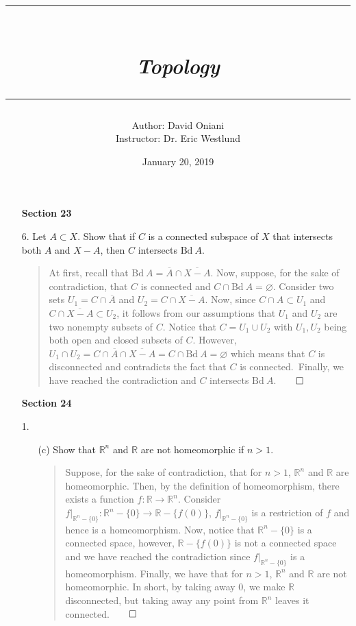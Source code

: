 \documentclass[12pt, a4paper]{article}
\title{\rule{\paperwidth - 150pt}{1pt}\textbf{\\\textit{Topology}\\}\rule{\paperwidth - 150pt}{1pt}}
\author
{
Author: David Oniani\\
Instructor: Dr. Eric Westlund
}
\date{January 20, 2019}
\newcommand{\reals}{\mathbb{R}}        %
\renewcommand{\emptyset}{\varnothing}  %
\begin{document}
\maketitle


\begin{itemize}
\item[]
\item[]
{\large \textbf{Section 23}}
\vspace{0.3cm}

\item[6.]
Let $A \subset X$. Show that if $C$ is a connected subspace of $X$
that intersects both $A$ and $X - A$, then $C$ intersects $\mbox{Bd} \ A$.
\begin{quote}
At first, recall that $\mbox{Bd} \ A = \overline{A} \cap \overline{X - A}$.
Now, suppose, for the sake of contradiction, that $C$ is connected and $C \cap \mbox{Bd} \ A = \emptyset$.
Consider two sets $U_1 = C \cap \overline{A}$ and $U_2 = C \cap \overline{X - A}$.
Now, since $C \cap A \subset U_1$ and $C \cap \overline{X - A} \subset U_2$, it follows
from our assumptions that $U_1$ and $U_2$ are two nonempty subsets of $C$.
Notice that $C = U_1 \cup U_2$ with $U_1, U_2$ being both open and closed subsets of $C$.
However, $U_1 \cap U_2 = C \cap \overline{A} \cap \overline{X - A} = C \cap \mbox{Bd} \ A = \emptyset$
which means that $C$ is disconnected and contradicts the fact that $C$ is connected.\
Finally, we have reached the contradiction and $C$ intersects $\mbox{Bd} \ A$.$\qed$
\end{quote}

\item[]
\item[]
\item[]
{\large \textbf{Section 24}}
\vspace{0.3cm}

\item[1.]
\begin{itemize}
\item[(c)]
Show that $\reals^n$ and $\reals$ are not homeomorphic if $n > 1$.
\begin{quote}
Suppose, for the sake of contradiction, that for $n > 1$, $\reals^n$ and $\reals$
are homeomorphic. Then, by the definition of homeomorphism, there exists a function
$f : \reals \to \reals^n$. Consider $\left.f \right|_{\reals^n-\{0\}} : \reals^n-\{0\} \to \reals - \{f(0)\}$,
$\left.f \right|_{\reals^n-\{0\}}$ is a restriction of $f$ and hence is a homeomorphism.
Now, notice that $\reals^n-\{0\}$ is a connected space, however, $\reals-\{f(0)\}$ is not a connected
space and we have reached the contradiction since $\left.f \right|_{\reals^n-\{0\}}$ is a homeomorphism.
Finally, we have that for $n > 1$, $\reals^n$ and $\reals$ are not homeomorphic.
In short, by taking away $0$, we make $\reals$ disconnected, but taking away any point from $\reals^n$
leaves it connected.$\qed$
\end{quote}
\end{itemize}


\end{itemize}
\end{document}
